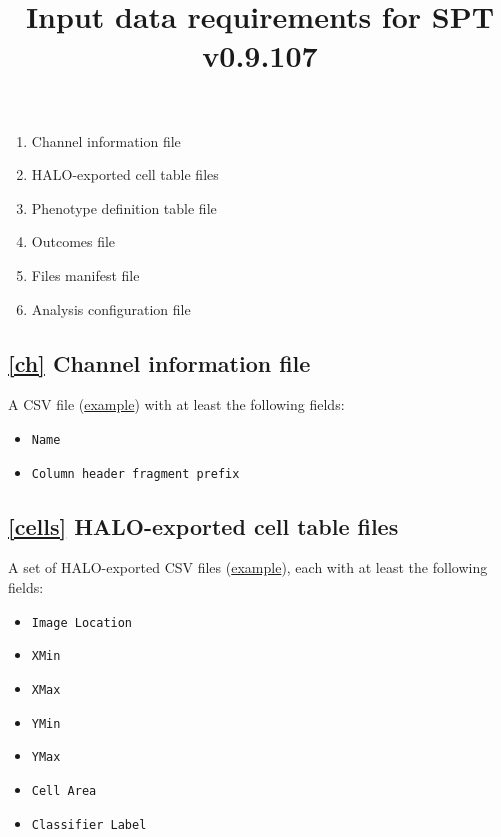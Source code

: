 \documentclass[14pt]{article}
\begin{document}
\title{Input data requirements for SPT v0.9.107}
\author{}
\maketitle

\begin{center}
\begin{varwidth}{0.4\textwidth}
\begin{enumerate}
  \itemsep0em
  \item{\label{ch}Channel information file}
  \item{\label{cells}HALO-exported cell table files}
  \item{\label{pheno}Phenotype definition table file}
  \item{\label{outcomes}Outcomes file}
  \item{\label{files}Files manifest file}
  \item{\label{run}Analysis configuration file}
\end{enumerate}
\end{varwidth}
\end{center}

\newpage

\subsection*{\ref{ch} Channel information file}
A CSV file (\href{https://github.com/nadeemlab/SPT/blob/main/tests/data/elementary_phenotypes.csv}{example})
 with at least the following fields:

\begin{itemize}
  \itemsep0em
  \item[]{\colorbox{yellow!25}{\texttt{Name}}}
  \item[]{\colorbox{yellow!25}{\texttt{Column header fragment prefix}}}
\end{itemize}

\subsection*{\ref{cells} HALO-exported cell table files} A set of HALO-exported CSV files (\href{https://github.com/nadeemlab/SPT/blob/main/tests/data/2779f21192cb0ce1479b2bf7fb20ebba.csv}{example}), each with at least the following fields:

\begin{itemize}
  \itemsep0em
  \item[]{\colorbox{yellow!25}{\texttt{Image Location}}}
  \item[]{\colorbox{yellow!25}{\texttt{XMin}}}
  \item[]{\colorbox{yellow!25}{\texttt{XMax}}}
  \item[]{\colorbox{yellow!25}{\texttt{YMin}}}
  \item[]{\colorbox{yellow!25}{\texttt{YMax}}}
  \item[]{\colorbox{yellow!25}{\texttt{Cell Area}}}
  \item[]{\colorbox{yellow!25}{\texttt{Classifier Label}}}
\end{itemize}
\end{document}
